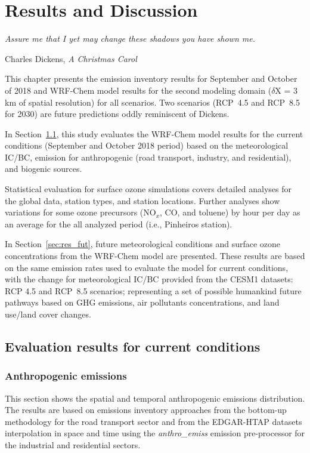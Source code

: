 \chapter{\bf Results and Discussion}\label{chap:resul}
\epigraph{\textit{Assure me that I yet may change these shadows you have shown me.}}{Charles Dickens, \textit{A Christmas Carol}}
   \noindent  This chapter presents the emission inventory results for September and October of 2018 and WRF-Chem model results for the second modeling domain ($\delta$X = 3 km of spatial resolution) for all scenarios.
   Two scenarios (RCP~4.5 and RCP~8.5 for 2030) are future predictions oddly reminiscent of Dickens.
      
   In Section~\ref{sec:res_curr}, this study evaluates the WRF-Chem model results for the current conditions (September and October 2018 period) based on the meteorological IC/BC, emission for anthropogenic (road transport, industry, and residential), and biogenic sources.
   
   Statistical evaluation for surface ozone simulations covers detailed analyses for the global data, station types, and station locations.
   Further analyses show variations for some ozone precursors (NO$_x$, CO, and toluene) by hour per day as an average for the all analyzed period (i.e., Pinheiros station).
   
   In Section~\ref{sec:res_fut}, future meteorological conditions and surface ozone concentrations from the WRF-Chem model are presented. 
   These results are based on the same emission rates used to evaluate the model for current conditions, with the change for meteorological IC/BC provided from the CESM1 datasets: RCP 4.5 and RCP~8.5 scenarios; representing a set of possible humankind future pathways based on GHG emissions, air pollutants concentrations, and land use/land cover changes.   
   
   \section{Evaluation results for current conditions}\label{sec:res_curr}
    
  \subsection{Anthropogenic emissions}\label{subsec:res_anth}
   This section shows the spatial and temporal anthropogenic emissions distribution.
   The results are based on emissions inventory approaches from the bottom-up methodology for the road transport sector \citep{Andrade2015} and from the EDGAR-HTAP datasets \citep{Janssens2015} interpolation in space and time using the {\it anthro\_emiss} emission pre-processor \citep{Kumar2020} for the industrial and residential sectors.
   
